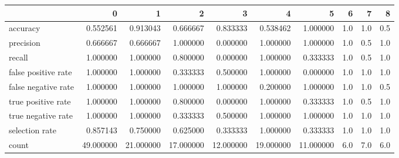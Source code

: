 \begin{tabular}{lrrrrrrrrr}
\toprule
{} &          0 &          1 &          2 &          3 &          4 &          5 &    6 &    7 &    8 \\
\midrule
accuracy            &   0.552561 &   0.913043 &   0.666667 &   0.833333 &   0.538462 &   1.000000 &  1.0 &  1.0 &  0.5 \\
precision           &   0.666667 &   0.666667 &   1.000000 &   0.000000 &   1.000000 &   1.000000 &  1.0 &  0.5 &  1.0 \\
recall              &   1.000000 &   1.000000 &   0.800000 &   0.000000 &   1.000000 &   0.333333 &  1.0 &  0.5 &  1.0 \\
false positive rate &   1.000000 &   1.000000 &   0.333333 &   0.500000 &   1.000000 &   0.000000 &  1.0 &  1.0 &  1.0 \\
false negative rate &   1.000000 &   1.000000 &   1.000000 &   1.000000 &   0.200000 &   1.000000 &  1.0 &  1.0 &  0.5 \\
true positive rate  &   1.000000 &   1.000000 &   0.800000 &   0.000000 &   1.000000 &   0.333333 &  1.0 &  0.5 &  1.0 \\
true negative rate  &   1.000000 &   1.000000 &   0.333333 &   0.500000 &   1.000000 &   1.000000 &  1.0 &  1.0 &  1.0 \\
selection rate      &   0.857143 &   0.750000 &   0.625000 &   0.333333 &   1.000000 &   0.333333 &  1.0 &  1.0 &  1.0 \\
count               &  49.000000 &  21.000000 &  17.000000 &  12.000000 &  19.000000 &  11.000000 &  6.0 &  7.0 &  6.0 \\
\bottomrule
\end{tabular}
